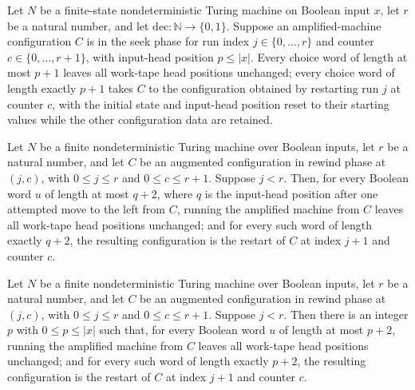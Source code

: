 \begin{theorem}
\label{Randomized.Amplify.seek_run}
\leanok
{}
Let $N$ be a finite-state nondeterministic Turing machine on Boolean input $x$, let $r$
be a natural number, and let $\mathrm{dec}:\mathbb{N}\to\{0,1\}$. Suppose an
amplified-machine configuration $C$ is in the seek phase for run index
$j\in\{0,\ldots,r\}$ and counter $c\in\{0,\ldots,r+1\}$, with input-head position $p\le
|x|$. Every choice word of length at most $p+1$ leaves all work-tape head positions
unchanged; every choice word of length exactly $p+1$ takes $C$ to the configuration
obtained by restarting run $j$ at counter $c$, with the initial state and input-head
position reset to their starting values while the other configuration data are retained.
\end{theorem}

\begin{theorem}
\label{Randomized.Amplify.rewind_run_pos}
\leanok
{}
Let $N$ be a finite nondeterministic Turing machine over Boolean inputs, let $r$ be a
natural number, and let $C$ be an augmented configuration in rewind phase at $(j,c)$,
with $0\le j\le r$ and $0\le c\le r+1$. Suppose $j<r$. Then, for every Boolean word $u$
of length at most $q+2$, where $q$ is the input-head position after one attempted move
to the left from $C$, running the amplified machine from $C$ leaves all work-tape head
positions unchanged; and for every such word of length exactly $q+2$, the resulting
configuration is the restart of $C$ at index $j+1$ and counter $c$.
\end{theorem}

\begin{theorem}
\label{Randomized.Amplify.rewind_run}
\leanok
{}
Let $N$ be a finite nondeterministic Turing machine over Boolean inputs, let $r$ be a
natural number, and let $C$ be an augmented configuration in rewind phase at $(j,c)$,
with $0\le j\le r$ and $0\le c\le r+1$. Suppose $j<r$. Then there is an integer $p$ with
$0\le p\le |x|$ such that, for every Boolean word $u$ of length at most $p+2$, running
the amplified machine from $C$ leaves all work-tape head positions unchanged; and for
every such word of length exactly $p+2$, the resulting configuration is the restart of
$C$ at index $j+1$ and counter $c$.
\end{theorem}

